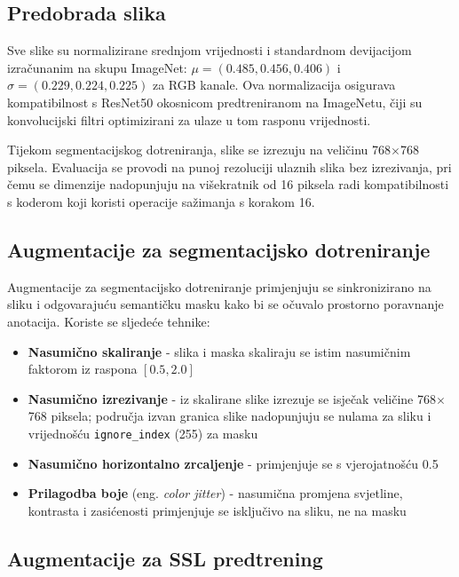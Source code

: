 \documentclass[diplomskirad]{fer}
\begin{document}
\subsection{Predobrada slika}

Sve slike su normalizirane srednjom vrijednosti i standardnom devijacijom izračunanim na skupu ImageNet: $\mu = (0.485, 0.456, 0.406)$ i $\sigma = (0.229, 0.224, 0.225)$ za RGB kanale. Ova normalizacija osigurava kompatibilnost s ResNet50 okosnicom predtreniranom na ImageNetu, čiji su konvolucijski filtri optimizirani za ulaze u tom rasponu vrijednosti.

Tijekom segmentacijskog dotreniranja, slike se izrezuju na veličinu 768$\times$768 piksela. Evaluacija se provodi na punoj rezoluciji ulaznih slika bez izrezivanja, pri čemu se dimenzije nadopunjuju na višekratnik od 16 piksela radi kompatibilnosti s koderom koji koristi operacije sažimanja s korakom 16.

\subsection{Augmentacije za segmentacijsko dotreniranje}

Augmentacije za segmentacijsko dotreniranje primjenjuju se sinkronizirano na sliku i odgovarajuću semantičku masku kako bi se očuvalo prostorno poravnanje anotacija. Koriste se sljedeće tehnike:

\begin{itemize}
	\item \textbf{Nasumično skaliranje} - slika i maska skaliraju se istim nasumičnim faktorom iz raspona $[0.5, 2.0]$
	\item \textbf{Nasumično izrezivanje} - iz skalirane slike izrezuje se isječak veličine 768$\times$768 piksela; područja izvan granica slike nadopunjuju se nulama za sliku i vrijednošću \texttt{ignore\_index} (255) za masku
	\item \textbf{Nasumično horizontalno zrcaljenje} - primjenjuje se s vjerojatnošću 0.5
	\item \textbf{Prilagodba boje} (eng. \textit{color jitter}) - nasumična promjena svjetline, kontrasta i zasićenosti primjenjuje se isključivo na sliku, ne na masku
\end{itemize}

\subsection{Augmentacije za SSL predtrening}
\end{document}
